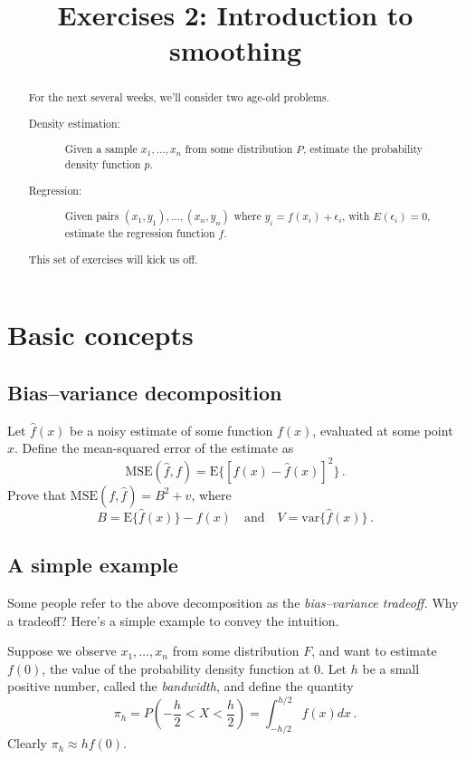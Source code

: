\documentclass{mynotes}
\title[Exercises 2 $\cdot$ SSC 383D]{Exercises 2: Introduction to smoothing}
\date{}  %
\newcommand{\E}{\mbox{E}}
\newcommand{\MSE}{\mbox{MSE}}
\newcommand{\var}{\mbox{var}}
\begin{document}
\maketitle%

\begin{abstract}
For the next several weeks, we'll consider two age-old problems.

\begin{description}
\item[Density estimation:] Given a sample $x_1, \ldots, x_n$ from some distribution $P$, estimate the probability density function $p$.

\item[Regression:] Given pairs $(x_1, y_1), \ldots, (x_n, y_n)$ where $y_i = f(x_i) + \epsilon_i$, with $E(\epsilon_i) = 0$, estimate the regression function $f$.
\end{description}
This set of exercises will kick us off.



\end{abstract}

\section{Basic concepts}

\subsection{Bias--variance decomposition}

Let $\hat{f}(x)$ be a noisy estimate of some function $f(x)$, evaluated at some point $x$.  Define the mean-squared error of the estimate as
$$
\MSE(\hat{f}, f) = \E\{ [ f(x) - \hat{f}(x)]^2 \} \, .
$$
Prove that $\MSE(f, \hat{f}) = B^2 + v$, where
$$
B = \E \{ \hat{f}(x) \} - f(x) \quad \mbox{and} \quad V = \var\{ \hat{f}(x) \} \, .
$$

\subsection{A simple example}

Some people refer to the above decomposition as the \textit{bias--variance tradeoff.}  Why a tradeoff?  Here's a simple example to convey the intuition.

Suppose we observe $x_1, \ldots, x_n$ from some distribution $F$, and want to estimate $f(0)$, the value of the probability density function at 0.  Let $h$ be a small positive number, called the \textit{bandwidth}, and define the quantity
$$
\pi_h = P\left( -\frac{h}{2} < X < \frac{h}{2} \right) = \int_{-h/2}^{h/2} f(x) dx \, .
$$
Clearly $\pi_h \approx h f(0)$.
\end{document}
